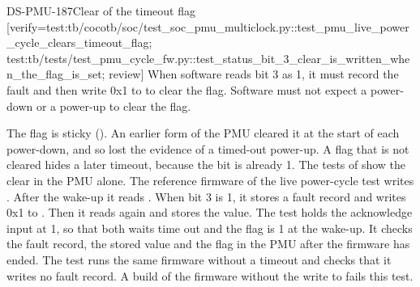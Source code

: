 \begin{requirement}{DS-PMU-187}{Clear of the timeout flag}
[verify={test:tb/cocotb/soc/test_soc_pmu_multiclock.py::test_pmu_live_power_cycle_clears_timeout_flag; test:tb/tests/test_pmu_cycle_fw.py::test_status_bit_3_clear_is_written_when_the_flag_is_set; review}]
When software reads  bit 3 as 1, it must record the fault and then write 0x1 to  to clear the flag. Software must not expect a power-down or a power-up to clear the flag.
\end{requirement}
\begin{information}
The flag is sticky (). An earlier form of the PMU cleared it at the start of each power-down, and so lost the evidence of a timed-out power-up. A flag that is not cleared hides a later timeout, because the bit is already 1. The tests of  show the clear in the PMU alone. The reference firmware of the live power-cycle test writes . After the wake-up it reads . When bit 3 is 1, it stores a fault record and writes 0x1 to . Then it reads  again and stores the value. The test  holds the acknowledge input at 1, so that both waits time out and the flag is 1 at the wake-up. It checks the fault record, the stored value and the flag in the PMU after the firmware has ended. The test  runs the same firmware without a timeout and checks that it writes no fault record. A build of the firmware without the write to  fails this test.
\end{information}

